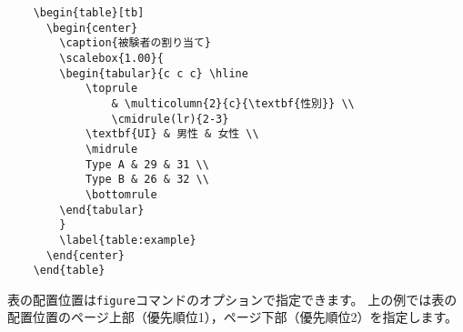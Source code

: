 \begin{verbatim}
    \begin{table}[tb]
      \begin{center}
        \caption{被験者の割り当て}
        \scalebox{1.00}{
        \begin{tabular}{c c c} \hline
            \toprule
                & \multicolumn{2}{c}{\textbf{性別}} \\
                \cmidrule(lr){2-3}
            \textbf{UI} & 男性 & 女性 \\
            \midrule
            Type A & 29 & 31 \\
            Type B & 26 & 32 \\
            \bottomrule
        \end{tabular}
        }
        \label{table:example}
      \end{center}
    \end{table}
\end{verbatim}
表の配置位置は{\tt figure}コマンドのオプションで指定できます。
上の例では表の配置位置のページ上部（優先順位1），ページ下部（優先順位2）を指定します。

\begin{table}[tb]
  \begin{center}
    \caption{被験者の割り当て．}
    \label{table:example}
  \end{center}
\end{table}
